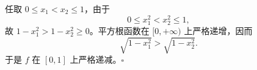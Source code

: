 任取 $0\le x_1<x_2\le1$，由于
\[
0\le x_1^2<x_2^2\le1,
\]
故 $1-x_1^2>1-x_2^2\ge0$。平方根函数在 $[0,+\infty)$ 上严格递增，因而
\[
\sqrt{1-x_1^2}>\sqrt{1-x_2^2}.
\]
于是 $f$ 在 $[0,1]$ 上严格递减。$\square$
